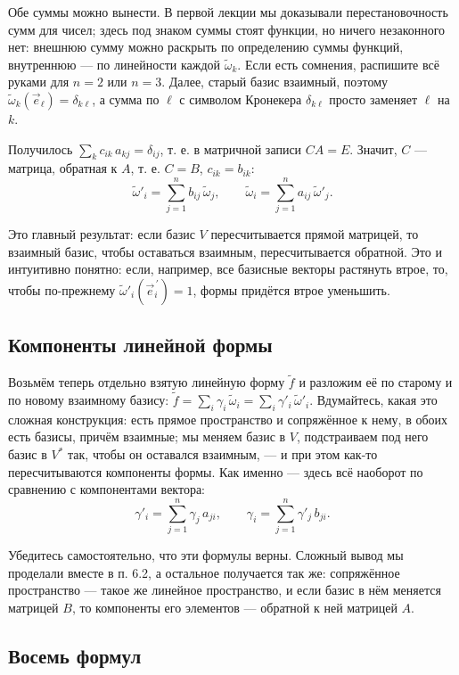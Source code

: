 \documentclass[11pt,a4paper]{article}
\begin{document}
Обе суммы можно вынести. В первой лекции мы доказывали перестановочность сумм для чисел; здесь под знаком суммы стоят функции, но ничего незаконного нет: внешнюю сумму можно раскрыть по определению суммы функций, внутреннюю — по линейности каждой $\tilde\omega_k$. Если есть сомнения, распишите всё руками для $n = 2$ или $n = 3$. Далее, старый базис взаимный, поэтому $\tilde\omega_k(\vec e_\ell) = \delta_{k\ell}$, а сумма по $\ell$ с символом Кронекера $\delta_{k\ell}$ просто заменяет $\ell$ на $k$.

Получилось $\sum_k c_{ik}\, a_{kj} = \delta_{ij}$, т. е. в матричной записи $CA = E$. Значит, $C$ — матрица, обратная к $A$, т. е. $C = B$, $c_{ik} = b_{ik}$:
\[
\tilde\omega'_i = \sum_{j=1}^n b_{ij}\, \tilde\omega_j, \qquad \tilde\omega_i = \sum_{j=1}^n a_{ij}\, \tilde\omega'_j.
\]

Это главный результат: если базис $V$ пересчитывается прямой матрицей, то взаимный базис, чтобы оставаться взаимным, пересчитывается обратной. Это и интуитивно понятно: если, например, все базисные векторы растянуть втрое, то, чтобы по-прежнему $\tilde\omega'_i(\vec e^{\,\prime}_i) = 1$, формы придётся втрое уменьшить.

\subsection{Компоненты линейной формы}

Возьмём теперь отдельно взятую линейную форму $\tilde f$ и разложим её по старому и по новому взаимному базису: $\tilde f = \sum_i \gamma_i\, \tilde\omega_i = \sum_i \gamma'_i\, \tilde\omega'_i$. Вдумайтесь, какая это сложная конструкция: есть прямое пространство и сопряжённое к нему, в обоих есть базисы, причём взаимные; мы меняем базис в $V$, подстраиваем под него базис в $V^*$ так, чтобы он оставался взаимным, — и при этом как-то пересчитываются компоненты формы. Как именно — здесь всё наоборот по сравнению с компонентами вектора:
\[
\gamma'_i = \sum_{j=1}^n \gamma_j\, a_{ji}, \qquad \gamma_i = \sum_{j=1}^n \gamma'_j\, b_{ji}.
\]

Убедитесь самостоятельно, что эти формулы верны. Сложный вывод мы проделали вместе в п. 6.2, а остальное получается так же: сопряжённое пространство — такое же линейное пространство, и если базис в нём меняется матрицей $B$, то компоненты его элементов — обратной к ней матрицей $A$.

\subsection{Восемь формул}
\end{document}
